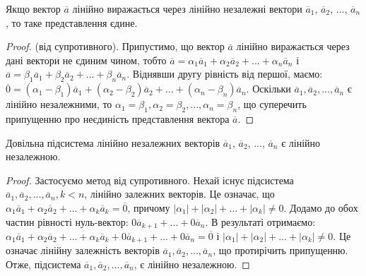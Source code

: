 \begin{claim}
	Якщо вектор $\overline{a}$ лінійно виражається через лінійно незалежні вектори
	$\overline{a}_1$, $\overline{a}_2$, $...$, $\overline{a}_n$, то таке представлення єдине. 
\end{claim}
\begin{proof}
	(від супротивного). Припустимо, що вектор $\overline{a}$ лінійно виражається
	через дані вектори не єдиним чином, тобто
	$\overline{a} = \alpha_{1}\overline{a}_{1} + \alpha_{2}\overline{a}_{2} + ... + \alpha_{n}\overline{a}_{n}$ і $\overline{a} = \beta_{1}\overline{a}_{1} + \beta_{2}\overline{a}_{2} + ... + \beta_{n}\overline{a}_{n}$.
	Віднявши другу рівність від першої, маємо:
	$\overline{0} = (\alpha_1 - \beta_1)\overline{a}_1 + (\alpha_2 - \beta_2)\overline{a}_2 + ... + (\alpha_n - \beta_n)\overline{a}_n$.
	Оскільки $\overline{a}_1, \overline{a}_2, ..., \overline{a}_n$ є лінійно незалежними, то $\alpha_1 = \beta_1, \alpha_2 = \beta_2, ..., \alpha_n = \beta_n$, що
	суперечить припущенню про неєдиність представлення вектора $\overline{a}$.
\end{proof}

\begin{claim}
	Довільна підсистема лінійно незалежних векторів $\overline{a}_1$, $\overline{a}_2$, $...$, $\overline{a}_n$ є лінійно
	незалежною.
\end{claim}
\begin{proof}
	Застосуємо метод від супротивного. Нехай існує підсистема
	$\overline{a}_1, \overline{a}_2, ..., \overline{a}_n, k<n$, лінійно залежних векторів. Це означає, що
	$\alpha_1\overline{a}_1 + \alpha_2\overline{a}_2 + ... + \alpha_{k}\overline{a}_{k} = \overline{0}$, причому $|\alpha_1| + |\alpha_2| + ... + |\alpha_k| \neq 0$. Додамо до обох
	частин рівності нуль-вектор: $0\overline{a}_{k+1} + ... + 0\overline{a}_{n}$. В результаті отримаємо:
	$\alpha_1\overline{a}_1 + \alpha_2\overline{a}_2 + ... + \alpha_k\overline{a}_k + 0\overline{a}_{k+1} + ... + 0\overline{a}_{n} = \overline{0}$ і $|\alpha_1| + |\alpha_2| + ... + |\alpha_k| \neq 0$.
	Це означає лінійну залежність векторів $\overline{a}_1, \overline{a}_2, ..., \overline{a}_n$, що протирічить припущенню.
	Отже, підсистема $\overline{a}_1, \overline{a}_2, ..., \overline{a}_n$, є лінійно незалежною. 
\end{proof}

